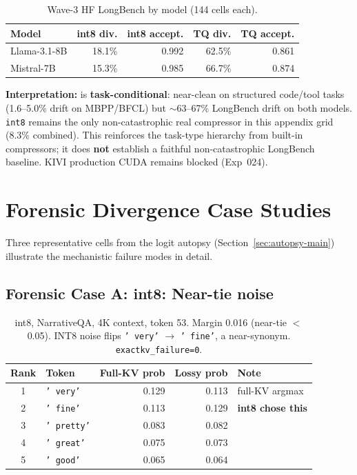 \documentclass[11pt]{article}
\newcommand{\ttpath}[1]{\path{#1}}
\begin{document}
\begin{table}[H]
\centering\small
\caption{Wave-3 HF LongBench by model (144 cells each).}
\label{tab:faithful-wave3-longbench}
\begin{tabular}{lrrrr}
\toprule
\textbf{Model} & \textbf{int8 div.} & \textbf{int8 accept.} & \textbf{TQ div.} & \textbf{TQ accept.} \\
\midrule
Llama-3.1-8B & 18.1\% & 0.992 & 62.5\% & 0.861 \\
Mistral-7B & 15.3\% & 0.985 & 66.7\% & 0.874 \\
\bottomrule
\end{tabular}
\end{table}

\begin{sloppypar}
\noindent\textbf{Interpretation:} \ttpath{turboquant_experimental} is
\textbf{task-conditional}: near-clean on structured code/tool tasks (1.6--5.0\%
drift on MBPP/BFCL) but $\sim$63--67\% LongBench drift on both models. \texttt{int8}
remains the only non-catastrophic real compressor in this appendix grid (8.3\%
combined). This reinforces the task-type hierarchy from built-in compressors; it does
\textbf{not} establish a faithful non-catastrophic LongBench baseline. KIVI production
CUDA remains blocked (Exp~024).
\end{sloppypar}


\section{Forensic Divergence Case Studies}
\label{sec:forensic-cases}

Three representative cells from the logit autopsy (Section~\ref{sec:autopsy-main})
illustrate the mechanistic failure modes in detail.

\subsection{Forensic Case A: int8: Near-tie noise}

\begin{table}[H]
\centering\small
\begin{tabular}{clrrl}
\toprule
\textbf{Rank} & \textbf{Token} & \textbf{Full-KV prob} & \textbf{Lossy prob} & \textbf{Note} \\
\midrule
1 & \texttt{' very'} & 0.129 & 0.113 & full-KV argmax \\
2 & \texttt{' fine'} & 0.113 & 0.129 & \textbf{int8 chose this} \\
3 & \texttt{' pretty'} & 0.083 & 0.082 & \\
4 & \texttt{' great'} & 0.075 & 0.073 & \\
5 & \texttt{' good'} & 0.065 & 0.064 & \\
\bottomrule
\end{tabular}
\caption{int8, NarrativeQA, 4K context, token 53. Margin 0.016 (near-tie $<$0.05).
INT8 noise flips \texttt{' very'} $\to$ \texttt{' fine'}, a near-synonym.
\texttt{exactkv\_failure=0}.}
\end{table}
\end{document}
